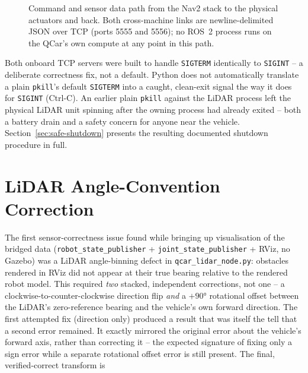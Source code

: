 \begin{figure}[htbp]
{%
  }
  \caption[Command/sensor data path: Nav2 to physical actuators]{Command and sensor data path from the Nav2 stack to the
    physical actuators and back. Both cross-machine links are
    newline-delimited JSON over TCP (ports 5555 and 5556); no ROS~2
    process runs on the QCar's own compute at any point in this
    path.}
  \label{fig:bridge-architecture}
\end{figure}

Both onboard TCP servers were built to handle \texttt{SIGTERM}
identically to \texttt{SIGINT} -- a deliberate correctness fix, not
a default. Python does not automatically translate a plain
\texttt{pkill}'s default \texttt{SIGTERM} into a caught, clean-exit
signal the way it does for \texttt{SIGINT} (Ctrl-C). An earlier
plain \texttt{pkill} against the LiDAR process left the physical
LiDAR unit spinning after the owning process had already exited --
both a battery drain and a safety concern for anyone near the
vehicle. Section~\ref{sec:safe-shutdown} presents the resulting
documented shutdown procedure in full.

\section{LiDAR Angle-Convention Correction}
\label{sec:lidar-angle}

The first sensor-correctness issue found while bringing up
visualisation of the bridged data (\texttt{robot\_state\_publisher} +
\texttt{joint\_state\_publisher} + RViz, no Gazebo) was a LiDAR
angle-binning defect in \texttt{qcar\_lidar\_node.py}: obstacles
rendered in RViz did not appear at their true bearing relative to the
rendered robot model. This required \emph{two} stacked, independent
corrections, not one -- a clockwise-to-counter-clockwise direction
flip \emph{and} a $+\ang{90}$ rotational offset between the LiDAR's
zero-reference bearing and the vehicle's own forward direction. The
first attempted fix (direction only) produced a result that was
itself the tell that a second error remained. It exactly mirrored
the original error about the vehicle's forward axis, rather than
correcting it -- the expected signature of fixing only a sign error
while a separate rotational offset error is still present. The
final, verified-correct transform is

